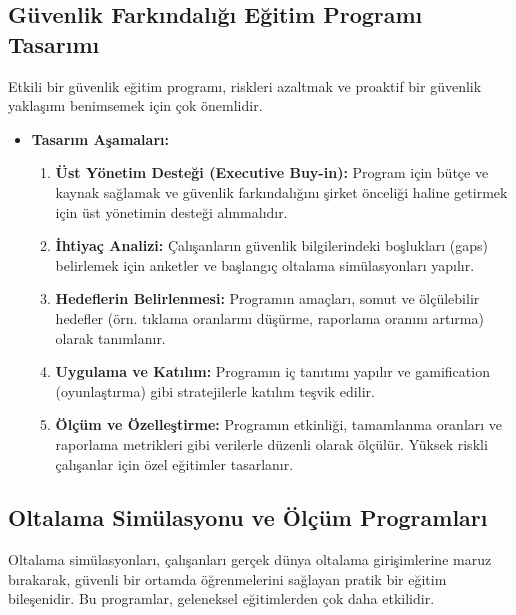 \subsection{Güvenlik Farkındalığı Eğitim Programı Tasarımı}

Etkili bir güvenlik eğitim programı, riskleri azaltmak ve proaktif bir güvenlik yaklaşımı benimsemek için çok önemlidir.

\begin{itemize}
    \item \textbf{Tasarım Aşamaları:}
    \begin{enumerate}
        \item \textbf{Üst Yönetim Desteği (Executive Buy-in):} Program için bütçe ve kaynak sağlamak ve güvenlik farkındalığını şirket önceliği haline getirmek için üst yönetimin desteği alınmalıdır.
        \item \textbf{İhtiyaç Analizi:} Çalışanların güvenlik bilgilerindeki boşlukları (gaps) belirlemek için anketler ve başlangıç oltalama simülasyonları yapılır.
        \item \textbf{Hedeflerin Belirlenmesi:} Programın amaçları, somut ve ölçülebilir hedefler (örn. tıklama oranlarını düşürme, raporlama oranını artırma) olarak tanımlanır.
        \item \textbf{Uygulama ve Katılım:} Programın iç tanıtımı yapılır ve gamification (oyunlaştırma) gibi stratejilerle katılım teşvik edilir.
        \item \textbf{Ölçüm ve Özelleştirme:} Programın etkinliği, tamamlanma oranları ve raporlama metrikleri gibi verilerle düzenli olarak ölçülür. Yüksek riskli çalışanlar için özel eğitimler tasarlanır.
    \end{enumerate}
\end{itemize}

\subsection{Oltalama Simülasyonu ve Ölçüm Programları}

Oltalama simülasyonları, çalışanları gerçek dünya oltalama girişimlerine maruz bırakarak, güvenli bir ortamda öğrenmelerini sağlayan pratik bir eğitim bileşenidir. Bu programlar, geleneksel eğitimlerden çok daha etkilidir.


